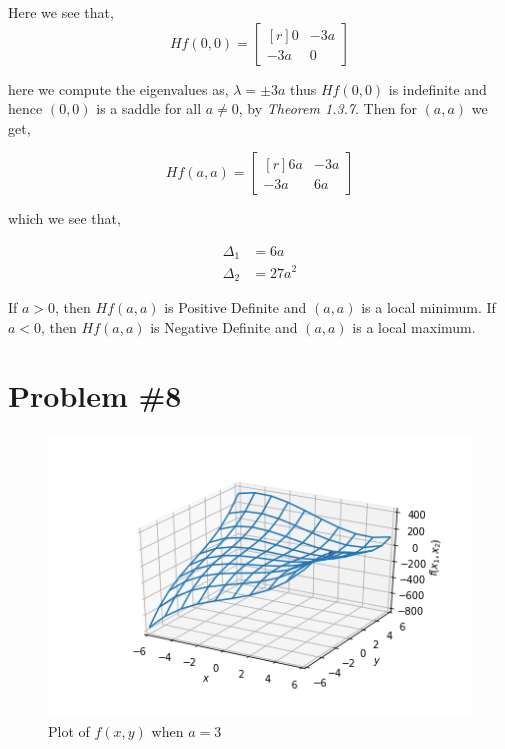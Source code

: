 \documentclass{article}
\begin{document}
Here we see that,
\begin{equation*}
    Hf(0,0) = \begin{bmatrix*}[r]
        0 & -3a \\
        -3a & 0
    \end{bmatrix*}
\end{equation*}

here we compute the eigenvalues as, $\lambda = \pm 3a$ thus $Hf(0,0)$ is indefinite and hence $(0,0)$ is a saddle for all $a \neq 0$, by \textit{Theorem 1.3.7}. Then for $(a,a)$ we get,

\begin{equation*}
    Hf(a,a) = \begin{bmatrix*}[r]
        6a & -3a \\
        -3a & 6a
    \end{bmatrix*}
\end{equation*}

which we see that,

\begin{align*}
    \Delta_1 &= 6a \\
    \Delta_2 &= 27a^2
\end{align*}

If $a > 0$, then $Hf(a,a)$ is Positive Definite and $(a,a)$ is a local minimum. If $a < 0$, then $Hf(a,a)$ is Negative Definite and $(a,a)$ is a local maximum.

\section*{Problem \#8}

\begin{figure}[H]
    \centering
    \includegraphics[scale=0.6]{aPos.png}
    \caption{Plot of $f(x,y)$ when $a = 3$}
    \label{fig:my_label}
\end{figure}
\end{document}
